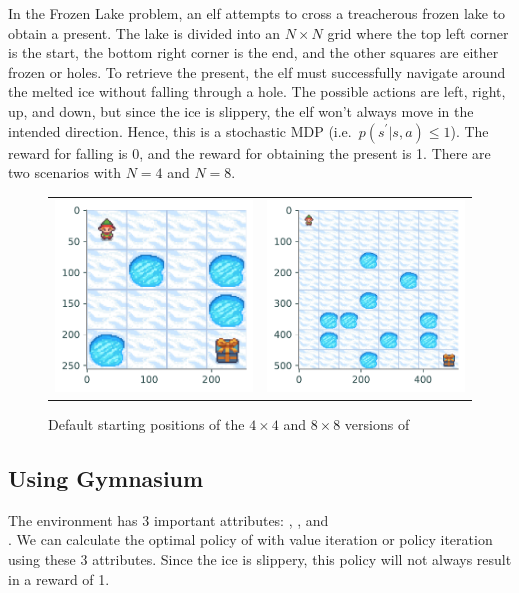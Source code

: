 In the Frozen Lake problem, an elf attempts to cross a treacherous frozen lake to obtain a present.
The lake is divided into an $N \times N$ grid where the top left corner is the start, the bottom right corner is the end, and the other squares are either frozen or holes.
To retrieve the present, the elf must successfully navigate around the melted ice without falling through a hole.
The possible actions are left, right, up, and down, but since the ice is slippery, the elf won't always move in the intended direction.
Hence, this is a stochastic MDP (i.e.\ $p(s^\prime|s,a)\leq1$).
The reward for falling is 0, and the reward for obtaining the present is 1.
There are two scenarios with $N=4$ and $N=8$.

\begin{figure}
    \centering
    \begin{tabular}{cc}
        \includegraphics[width=.45\textwidth]{figures/4x4_image.pdf} &
        \includegraphics[width=.45\textwidth]{figures/8x8_image.pdf}
    \end{tabular}
    \caption{Default starting positions of the $4\times4$ and $8\times8$ versions of }
    \label{fig:frozen_lake}
\end{figure}

\subsection*{Using Gymnasium}
The  environment has 3 important attributes: , , and \\ .
We can calculate the optimal policy of  with value iteration or policy iteration using these 3 attributes.
Since the ice is slippery, this policy will not always result in a reward of 1.

